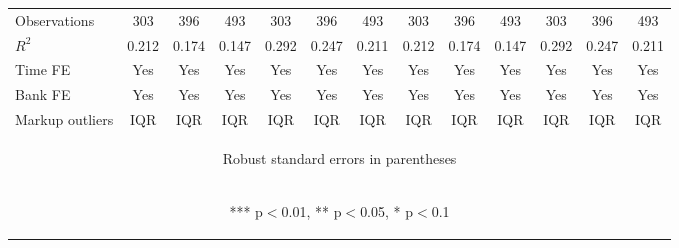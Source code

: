 \documentclass[]{article}
\begin{document}
\begin{center}
\begin{tabular}{lcccccccccccc}
Observations & 303 & 396 & 493 & 303 & 396 & 493 & 303 & 396 & 493 & 303 & 396 & 493 \\
$R^2$ & 0.212 & 0.174 & 0.147 & 0.292 & 0.247 & 0.211 & 0.212 & 0.174 & 0.147 & 0.292 & 0.247 & 0.211 \\
Time FE & Yes & Yes & Yes & Yes & Yes & Yes & Yes & Yes & Yes & Yes & Yes & Yes \\
Bank FE & Yes & Yes & Yes & Yes & Yes & Yes & Yes & Yes & Yes & Yes & Yes & Yes \\
 Markup outliers & IQR & IQR & IQR & IQR & IQR & IQR & IQR & IQR & IQR & IQR & IQR & IQR \\ \hline
\multicolumn{13}{c}{\begin{footnotesize} Robust standard errors in parentheses\end{footnotesize}} \\
\multicolumn{13}{c}{\begin{footnotesize} *** p$<$0.01, ** p$<$0.05, * p$<$0.1\end{footnotesize}} \\
\end{tabular}
\end{center}
\end{document}
